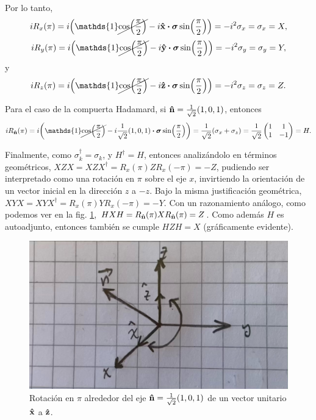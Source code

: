 \documentclass{scrartcl}
\newcommand{\inv}[1]{\frac{1}{#1}}
\renewcommand{\vb}[1]{\bm{#1}}
\DeclareRobustCommand{\[}{\begin{equation}}
\DeclareRobustCommand{\]}{\end{equation}}
\begin{document}
\begin{enumerate}
    Por lo tanto,
    \[ i R_x(\pi) = i \qty( \mathds{1} \cancel{\cos(\frac{\pi}{2})} - i \vu{x} \vdot \vb{\sigma} \sin(\frac{\pi}{2}) ) = -i^2 \sigma_x = \sigma_x = X, \]
    \[ i R_y(\pi) = i \qty( \mathds{1} \cancel{\cos(\frac{\pi}{2})} - i \vu{y} \vdot \vb{\sigma} \sin(\frac{\pi}{2}) ) = -i^2 \sigma_y = \sigma_y = Y, \]
    y
    \[ i R_z(\pi) = i \qty( \mathds{1} \cancel{\cos(\frac{\pi}{2})} - i \vu{z} \vdot \vb{\sigma} \sin(\frac{\pi}{2}) ) = -i^2 \sigma_z = \sigma_z = Z. \]
    
    Para el caso de la compuerta Hadamard, si $\vu{n} = \inv{\sqrt{2}}(1, 0, 1)$, entonces
    \[
        i R_{\vu{n}}(\pi) = i \qty( \mathds{1} \cancel{\cos(\frac{\pi}{2})} - i \inv{\sqrt{2}} (1, 0, 1) \vdot \vb{\sigma} \sin(\frac{\pi}{2}) ) = \inv{\sqrt{2}} (\sigma_x + \sigma_z) = \inv{\sqrt{2}}
        \begin{pmatrix} 1 & 1 \\ 1 & -1 \end{pmatrix}
        = H.
    \]
    
    Finalmente, como $\sigma_k^\dagger = \sigma_k$, y $H^\dagger = H$, entonces analizándolo en términos geométricos, $X Z X = X Z X^\dagger = R_x(\pi) Z R_x(-\pi) = -Z$, pudiendo ser interpretado como una rotación en $\pi$ sobre el eje $x$, invirtiendo la orientación de un vector inicial en la dirección $z$ a $-z$. Bajo la misma justificación geométrica, $X Y X = X Y X^\dagger = R_x(\pi) Y R_x(-\pi) = -Y$. Con un razonamiento análogo, como podemos ver en la fig. \ref{fig:I_2}, $H X H = R_{\vu{n}}(\pi) X R_{\vu{n}}(\pi) = Z$. Como además $H$ es autoadjunto, entonces también se cumple $H Z H = X$ (gráficamente evidente).
    \begin{figure}[t]
        \centering
        \includegraphics[width=.4\linewidth]{Images/IMG_3078.JPEG}
        \caption{Rotación en $\pi$ alrededor del eje $\vu{n} = \inv{\sqrt{2}} (1, 0, 1)$ de un vector unitario $\vu{x}$ a $\vu{z}$.}
        \label{fig:I_2}
    \end{figure}
    
    
    

\end{enumerate}
\end{document}
